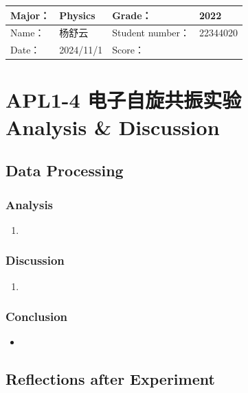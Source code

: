 
\begin{table}
	\renewcommand\arraystretch{1.7}
	\begin{tabularx}{\textwidth}{|X|X|X|X|}
		\hline
		Major：& Physics &Grade：& 2022\\
		\hline
		Name： & 杨舒云 & Student number：& 22344020\\
		\hline
		Date：& 2024/11/1 & Score： &\\
		\hline
	\end{tabularx}
\end{table}
\section{APL1-4 电子自旋共振实验 \\ Analysis \& Discussion}


\subsection{Data Processing}

\subsubsection{Analysis}
\begin{enumerate}
	\item 
\end{enumerate}

\subsubsection{Discussion}
\begin{enumerate}
	\item 
\end{enumerate}

\subsubsection{Conclusion}
\begin{itemize}
	\item 
\end{itemize}


\subsection{Reflections after Experiment}

\begin{question}
	
\end{question}

\begin{question}
	
\end{question}

\begin{question}
	
\end{question}
